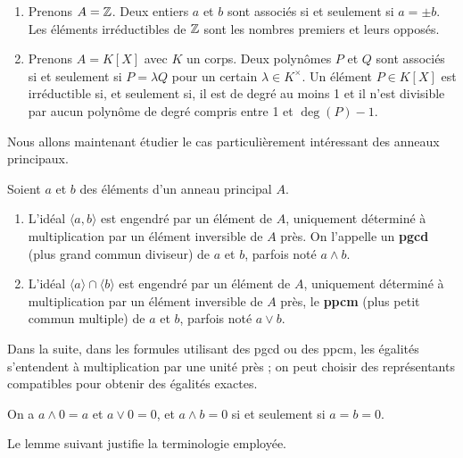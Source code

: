 \documentclass[]{report}
\begin{document}
\begin{ex}{}{}
    \begin{enumerate}
        \item Prenons $A = \mathbb{Z}$. Deux entiers $a$ et $b$ sont associés si et seulement si $a = \pm b$. Les éléments irréductibles de $\mathbb{Z}$ sont les nombres premiers et leurs opposés.
        \item Prenons $A = K[X]$ avec $K$ un corps. Deux polynômes $P$ et $Q$ sont associés si et seulement si $P = \lambda Q$ pour un certain $\lambda \in K^{\times}$. Un élément $P \in K[X]$ est irréductible si, et seulement si, il est de degré au moins 1 et il n'est divisible par aucun polynôme de degré compris entre 1 et $\deg(P) - 1$.
    \end{enumerate}
\end{ex}

Nous allons maintenant étudier le cas particulièrement intéressant des anneaux principaux.

\begin{df}{}{}
    Soient $a$ et $b$ des éléments d'un anneau principal $A$.
    \begin{enumerate}
        \item L'idéal $\langle a, b \rangle$ est engendré par un élément de $A$, uniquement déterminé à multiplication par un élément inversible de $A$ près. On l'appelle un \textbf{pgcd} (plus grand commun diviseur) de $a$ et $b$, parfois noté $a \wedge b$.
        \item L'idéal $\langle a \rangle \cap \langle b \rangle$ est engendré par un élément de $A$, uniquement déterminé à multiplication par un élément inversible de $A$ près, le \textbf{ppcm} (plus petit commun multiple) de $a$ et $b$, parfois noté $a \vee b$.
    \end{enumerate}
\end{df}

\begin{re}{}{}
    Dans la suite, dans les formules utilisant des pgcd ou des ppcm, les égalités s'entendent à multiplication par une unité près ; on peut choisir des représentants compatibles pour obtenir des égalités exactes.
\end{re}

\begin{ex}{}{}
    On a $a \wedge 0 = a$ et $a \vee 0 = 0$, et $a \wedge b = 0$ si et seulement si $a = b = 0$.
\end{ex}

Le lemme suivant justifie la terminologie employée.
\end{document}
